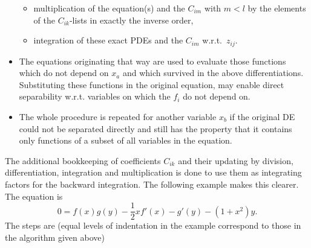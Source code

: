 \documentclass[12pt]{article}
\begin{document}
\begin{itemize}
 \begin{itemize}
  \item multiplication of the equation(s) and the $C_{im}$ with
        $m<l$ by the elements
  of the $C_{ik}$-lists in exactly the inverse order,
  \item integration of these exact PDEs and the $C_{im}$ w.r.t.\ $z_{ij}$.
 \end{itemize}
 \item The equations originating that way are used to evaluate those
 functions which do not depend on $x_a$ and which survived in the above
 differentiations. Substituting these functions in the original equation,
 may enable direct separability w.r.t. variables on which the $f_i$
 do not depend on.
 \item The whole procedure is repeated for another variable $x_b$ if the
 original DE could not be separated directly and still has the property that
 it contains only functions of a subset of all variables in the equation.
\end{itemize}
The additional bookkeeping of coefficients $C_{ik}$ and their updating by
division, differentiation, integration and multiplication is done to use
them as integrating factors for the backward integration.
The following example makes this clearer. The equation is
\begin{equation}
0 = f(x) g(y) - \frac{1}{2}xf'(x) - g'(y) - (1+x^2)y. \label{isep}
\end{equation}
The steps are (equal levels of indentation in the example correspond to
those in the algorithm given above)
\end{document}
